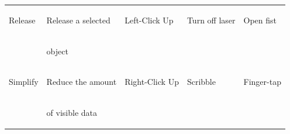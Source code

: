 \documentclass[runningheads,a4paper]{llncs}
\begin{document}
\begin{table}[t]
\begin{center}
\begin{tabular}{| l | l | l | l | l |}
  \begin{tiny}Release              \end{tiny}&\begin{tiny}Release a selected   \end{tiny}&\begin{tiny}Left-Click Up  \end{tiny}&\begin{tiny}Turn off laser\end{tiny}&\begin{tiny}Open fist        \end{tiny}\vspace{-0.05in}\\
  \begin{tiny}                     \end{tiny}&\begin{tiny}object               \end{tiny}&\begin{tiny}               \end{tiny}&\begin{tiny}              \end{tiny}&\begin{tiny}                 \end{tiny}\vspace{-0.02in}\\ \hline
  \begin{tiny}Simplify             \end{tiny}&\begin{tiny}Reduce the amount    \end{tiny}&\begin{tiny}Right-Click Up \end{tiny}&\begin{tiny}Scribble      \end{tiny}&\begin{tiny}Finger-tap       \end{tiny}\vspace{-0.05in}\\
  \begin{tiny}                     \end{tiny}&\begin{tiny}of visible data      \end{tiny}&\begin{tiny}               \end{tiny}&\begin{tiny}              \end{tiny}&\begin{tiny}                 \end{tiny}\vspace{-0.02in}\\ \hline

\end{tabular}
\end{center}
\end{table}
\end{document}
